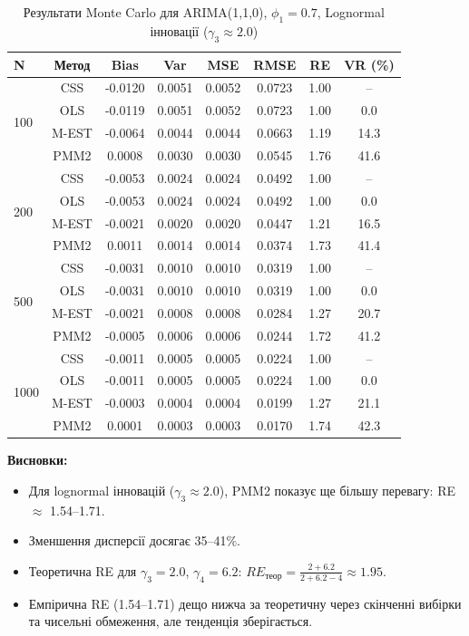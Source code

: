 \documentclass[12pt,a4paper]{article}
\begin{document}
\begin{table}[h]
\centering
\caption{Результати Monte Carlo для ARIMA(1,1,0), $\phi_1 = 0.7$, Lognormal інновації ($\gamma_3 \approx 2.0$)}
\label{tab:arima110_lognormal}
\begin{tabular}{@{}lccccccc@{}}
\toprule
\textbf{N} & \textbf{Метод} & \textbf{Bias} & \textbf{Var} & \textbf{MSE} & \textbf{RMSE} & \textbf{RE} & \textbf{VR (\%)} \\
\midrule
\multirow{4}{*}{100} & CSS  & -0.0120 & 0.0051 & 0.0052 & 0.0723 & 1.00 & -- \\
                     & OLS  & -0.0119 & 0.0051 & 0.0052 & 0.0723 & 1.00 & 0.0 \\
                     & M-EST & -0.0064 & 0.0044 & 0.0044 & 0.0663 & 1.19 & 14.3 \\
                     & PMM2 & 0.0008 & 0.0030 & 0.0030 & 0.0545 & 1.76 & 41.6 \\
\midrule
\multirow{4}{*}{200} & CSS  & -0.0053 & 0.0024 & 0.0024 & 0.0492 & 1.00 & -- \\
                     & OLS  & -0.0053 & 0.0024 & 0.0024 & 0.0492 & 1.00 & 0.0 \\
                     & M-EST & -0.0021 & 0.0020 & 0.0020 & 0.0447 & 1.21 & 16.5 \\
                     & PMM2 & 0.0011 & 0.0014 & 0.0014 & 0.0374 & 1.73 & 41.4 \\
\midrule
\multirow{4}{*}{500} & CSS  & -0.0031 & 0.0010 & 0.0010 & 0.0319 & 1.00 & -- \\
                     & OLS  & -0.0031 & 0.0010 & 0.0010 & 0.0319 & 1.00 & 0.0 \\
                     & M-EST & -0.0021 & 0.0008 & 0.0008 & 0.0284 & 1.27 & 20.7 \\
                     & PMM2 & -0.0005 & 0.0006 & 0.0006 & 0.0244 & 1.72 & 41.2 \\
\midrule
\multirow{4}{*}{1000} & CSS  & -0.0011 & 0.0005 & 0.0005 & 0.0224 & 1.00 & -- \\
                      & OLS  & -0.0011 & 0.0005 & 0.0005 & 0.0224 & 1.00 & 0.0 \\
                      & M-EST & -0.0003 & 0.0004 & 0.0004 & 0.0199 & 1.27 & 21.1 \\
                      & PMM2 & 0.0001 & 0.0003 & 0.0003 & 0.0170 & 1.74 & 42.3 \\
\bottomrule
\end{tabular}
\end{table}

\textbf{Висновки:}
\begin{itemize}
    \item Для lognormal інновацій ($\gamma_3 \approx 2.0$), PMM2 показує ще більшу перевагу: RE $\approx$ 1.54--1.71.
    \item Зменшення дисперсії досягає 35--41\%.
    \item Теоретична RE для $\gamma_3 = 2.0$, $\gamma_4 = 6.2$: $RE_{\text{теор}} = \frac{2+6.2}{2+6.2-4} \approx 1.95$.
    \item Емпірична RE (1.54--1.71) дещо нижча за теоретичну через скінченні вибірки та чисельні обмеження, але тенденція зберігається.
\end{itemize}
\end{document}
